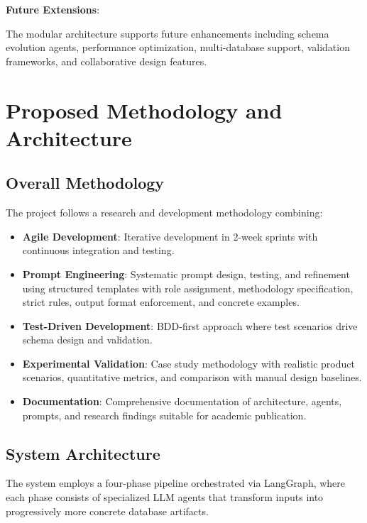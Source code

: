\documentclass[12pt,a4paper]{article}
\begin{document}
\textbf{Future Extensions}:

The modular architecture supports future enhancements including schema evolution agents, performance optimization, multi-database support, validation frameworks, and collaborative design features.

\section{Proposed Methodology and Architecture}

\subsection{Overall Methodology}

The project follows a research and development methodology combining:

\begin{itemize}
\item \textbf{Agile Development}: Iterative development in 2-week sprints with continuous integration and testing.

\item \textbf{Prompt Engineering}: Systematic prompt design, testing, and refinement using structured templates with role assignment, methodology specification, strict rules, output format enforcement, and concrete examples.

\item \textbf{Test-Driven Development}: BDD-first approach where test scenarios drive schema design and validation.

\item \textbf{Experimental Validation}: Case study methodology with realistic product scenarios, quantitative metrics, and comparison with manual design baselines.

\item \textbf{Documentation}: Comprehensive documentation of architecture, agents, prompts, and research findings suitable for academic publication.
\end{itemize}

\subsection{System Architecture}

The system employs a four-phase pipeline orchestrated via LangGraph, where each phase consists of specialized LLM agents that transform inputs into progressively more concrete database artifacts.
\end{document}
